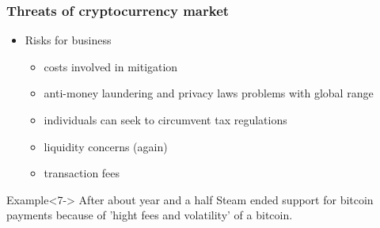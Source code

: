 \documentclass{beamer}
\begin{document}
\begin{frame}
\frametitle{Threats of cryptocurrency market}
    \begin{itemize}
        \item<1-> Risks for business
        \begin{itemize}
            \item<2-> costs involved in mitigation 
            \item<3-> anti-money laundering and privacy laws problems with global range
            \item<4-> individuals can seek to circumvent tax regulations 
            \item<5-> liquidity concerns (again)
            \item<6-> transaction fees
        \end{itemize}
    \end{itemize}
\vspace{20pt}
\begin{exampleblock}{Example}<7->
    After about year and a half Steam ended support for bitcoin payments because of
    'hight fees and volatility' of a bitcoin.
\end{exampleblock}
\end{frame}
\end{document}
